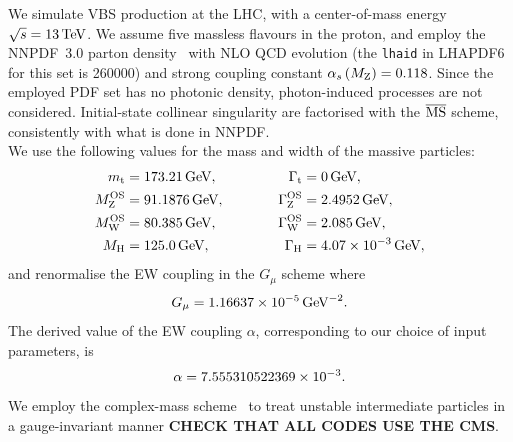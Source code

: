 We simulate VBS production at the LHC, with a center-of-mass energy $\sqrt s = 13 \,\text{TeV}$. We assume five massless flavours in the proton, and employ the NNPDF~3.0 parton 
density~\cite{Ball:2014uwa}
with NLO QCD evolution (the {\tt lhaid} in LHAPDF6~\cite{Buckley:2014ana} for this set is 260000) and strong coupling constant $\alpha_s\left( M_\text{Z} \right) = 0.118$. Since
the employed PDF set has no photonic density, photon-induced processes are not considered. Initial-state collinear singularity are factorised with the  ${\overline{\rm MS}}$ 
scheme, consistently with what is done in NNPDF.\\
We use the following values for the mass and width of the massive particles:
% 
\begin{alignat}{2}
                  m_\text{t}   &=  173.21\,\text{GeV},       & \quad \quad \quad \Gamma_\text{t} &= 0 \,\text{GeV},  \nonumber \\
                M_\text{Z}^\text{OS} &=  91.1876\,\text{GeV},      & \quad \quad \quad \Gamma_\text{Z}^\text{OS} &= 2.4952\,\text{GeV},  \nonumber \\
                M_\text{W}^\text{OS} &=  80.385\,\text{GeV},       & \Gamma_\text{W}^\text{OS} &= 2.085\,\text{GeV},  \nonumber \\
                M_{\rm H} &=  125.0\,\text{GeV},       &  \Gamma_\text{H}   &=  4.07 \times 10^{-3}\,\text{GeV},
\end{alignat}
and renormalise the EW coupling in the $G_\mu$ scheme \cite{Denner:2000bj} where
\begin{equation}
    G_{\mu}    = 1.16637\times 10^{-5}\,\text{GeV}^{-2}.
\end{equation}
The derived value of the EW coupling $\alpha$, corresponding to our choice of input parameters, is 
\begin{equation}
 \alpha = 7.555310522369 \times 10^{-3}. \\
\end{equation}
We employ the complex-mass scheme~\cite{Denner:1999gp,Denner:2005fg} to treat unstable intermediate particles in a gauge-invariant manner {\bf CHECK THAT ALL CODES USE THE CMS}.\\

